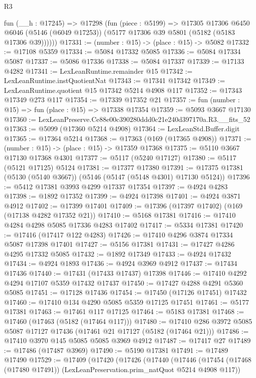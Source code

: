 \begin{lexlean}{R3}
\begin{coremodule}
      fun (__h : @17245) =>
      @17298
        (fun (piece : @5199) =>
        @17305
          @17306
          @6450
          @6046
          (@5146 (@6049 @17253))
          (@5177 @17306 @39 @5801 (@5182 (@5183 @17306 @39))))))
@17331 := (number : @15) -> (place : @15) -> @5082
@17332 := @17108 @5359
@17334 := @5084 @17332 @5085
@17336 := @5084 @17334 @5087
@17337 := @5086 @17336
@17338 := @5084 @17337
@17339 := @17133 @4282
@17341 := LexLeanRuntime.remainder @15
@17342 := LexLeanRuntime.instQuotientNat
@17343 := @17341 @17342
@17349 := LexLeanRuntime.quotient @15 @17342 @5214 @4908 @117
@17352 := @17343 @17349 @273 @117
@17354 := @17339 @17352 @21
@17357 := fun (number : @15) => fun (place : @15) => @17338 @17354
@17359 := @5093 @3667 @17130
@17360 := LexLeanPreserve.Ce88e00c390280ddd0c21e240d397170a.R3.__fits_52
@17363 := @5099 (@17360 @5214 @4908)
@17364 := LexLeanStd.Buffer.digit
@17365 := @17364 @5214
@17368 := @17363 (@169 (@17365 @4908))
@17371 := (number : @15) -> (place : @15) -> @17359 @17368
@17375 := @5110 @3667 @17130 @17368 @4301
@17377 := @5117 (@5240 @17127)
@17380 := @5117 (@5121 @17125) @5124
@17381 := @17377 @17380
@17391 := @17375 @17381 (@5130 (@5140 @3667)) (@5146 (@5147 (@5148 @4301) @17130 @5124))
@17396 := @5412 @17381 @3993 @4299 @17337 @17354
@17397 := @4924 @4283
@17398 := @1892 @17352
@17399 := @4924 @17398
@17401 := @4924 @3871 @4912
@17402 := @17399 @17401
@17409 := @17396 (@17397 @17402) (@169 (@17138 @4282 @17352 @21))
@17410 := @5168 @17381
@17416 := @17410 @4284 @4298 @5085 @17336 @4283 @17402
@17417 := @5334 @17381
@17420 := @17416 (@17417 @122 @4283)
@17426 := @17410 @4296 @3874 @17334 @5087 @17398 @17401
@17427 := @5156 @17381
@17431 := @17427 @4286 @4295 @17332 @5085
@17432 := @1892 @17349
@17433 := @4924 @17432
@17434 := @4924 @1893
@17436 := @4924 @3969 @4912
@17437 := @17434 @17436
@17440 := @17431 (@17433 @17437) @17398
@17446 := @17410 @4292 @4294 @17107 @5359 @17432 @17437
@17450 := @17427 @4288 @4291 @5360 @5085
@17451 := @17128 @17436
@17454 := @17450 (@17126 @17451) @17432
@17460 := @17410 @134 @4290 @5085 @5359 @17125 @17451
@17461 := @5177 @17381
@17463 := @17461 @117 @17125
@17464 := @5183 @17381
@17468 := @17460 (@17463 (@5182 (@17464 @117)))
@17480 := @17410 @286 @3972 @5085 @5087 @17127 @17436 (@17461 @21 @17127 (@5182 (@17464 @21)))
@17486 := @17410 @3970 @145 @5085 @5085 @3969 @4912
@17487 := @17417 @27
@17489 := @17486 (@17487 @3969)
@17490 := @5190 @17381
@17491 := @17489 @17490
@17529 := @17409
    (@17420
      (@17426
        (@17440
          (@17446
            (@17454 (@17468 (@17480 @17491)) (LexLeanPreservation.prim_natQuot @5214 @4908 @117))

\end{coremodule}
\end{lexlean}

